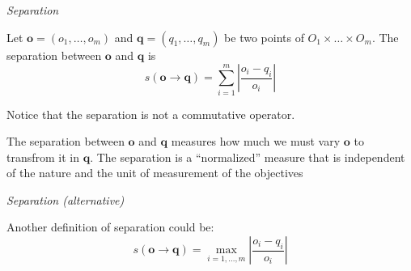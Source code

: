 \begin{defn}
\emph{Separation}

Let $\mathbf{o}=\left(o_{1},\dots,o_{m}\right)$ and $\mathbf{q}=\left(q_{1},\dots,q_{m}\right)$
be two points of $O_{1}\times\dots\times O_{m}$. The separation between
$\mathbf{o}$ and $\mathbf{q}$ is 
\[
s\left(\mathbf{o}\rightarrow\mathbf{q}\right)=\sum_{i=1}^{m}\left|\frac{o_{i}-q_{i}}{o_{i}}\right|
\]


Notice that the separation is not a commutative operator.\end{defn}
\begin{rem}
The separation between $\mathbf{o}$ and $\mathbf{q}$ measures how
much we must vary $\mathbf{o}$ to transfrom it in $\mathbf{q}$.
The separation is a ``normalized'' measure that is independent of
the nature and the unit of measurement of the objectives
\end{rem}

\begin{defn}
\emph{Separation (alternative)}

Another definition of separation could be:
\[
s\left(\mathbf{o}\rightarrow\mathbf{q}\right)=\max_{i=1,\dots,m}\left|\frac{o_{i}-q_{i}}{o_{i}}\right|
\]

\end{defn}
